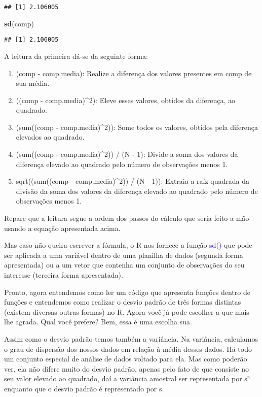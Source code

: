 \documentclass[14pt,titlepage, oneside, openany, a4paper]{book}
\newenvironment{Shaded}{\begin{snugshade}}{\end{snugshade}}
\newcommand{\KeywordTok}[1]{\textcolor[rgb]{0.13,0.29,0.53}{\textbf{#1}}}
\newcommand{\NormalTok}[1]{#1}
\providecommand{\tightlist}{%
  \setlength{\itemsep}{0pt}\setlength{\parskip}{0pt}}
\begin{document}
\begin{verbatim}
## [1] 2.106005
\end{verbatim}

\begin{Shaded}
\begin{Highlighting}[]
\KeywordTok{sd}\NormalTok{(comp)}
\end{Highlighting}
\end{Shaded}

\begin{verbatim}
## [1] 2.106005
\end{verbatim}

A leitura da primeira dá-se da seguinte forma:

\begin{enumerate}
\def\labelenumi{\arabic{enumi}.}
\tightlist
\item
  (comp - comp.media): Realize a diferença dos valores presentes em comp de sua média.
\item
  ((comp - comp.media)\^{}2): Eleve esses valores, obtidos da diferença, ao quadrado.
\item
  (sum((comp - comp.media)\^{}2)): Some todos os valores, obtidos pela diferença elevados ao quadrado.
\item
  (sum((comp - comp.media)\^{}2)) / (N - 1): Divide a soma dos valores da diferença elevado ao quadrado pelo número de observações menos 1.
\item
  sqrt((sum((comp - comp.media)\^{}2)) / (N - 1)): Extraia a raíz quadrada da divisão da soma dos valores da diferença elevado ao quadrado pelo número de observações menos 1.
\end{enumerate}

Repare que a leitura segue a ordem dos passos do cálculo que seria feito a mão usando a equação apresentada acima.

Mas caso não queira escrever a fórmula, o R nos fornece a função \textcolor{blue}{sd()} que pode ser aplicada a uma variável dentro de uma planilha de dados (segunda forma apresentada) ou a um vetor que contenha um conjunto de observações do seu interesse (terceira forma apresentada).

Pronto, agora entendemos como ler um código que apresenta funções dentro de funções e entendemos como realizar o desvio padrão de três formas distintas (existem diversas outras formas) no R. Agora você já pode escolher a que mais lhe agrada. Qual você prefere? Bem, essa é uma escolha sua.

Assim como o desvio padrão temos também a variância. Na variância, calculamos o grau de dispersão dos nossos dados em relação à média desses dados. Há todo um conjunto especial de análise de dados voltado para ela. Mas como poderão ver, ela não difere muito do desvio padrão, apenas pelo fato de que consiste no seu valor elevado ao quadrado, daí a variância amostral ser representada por s² enquanto que o desvio padrão é representado por s.
\end{document}
